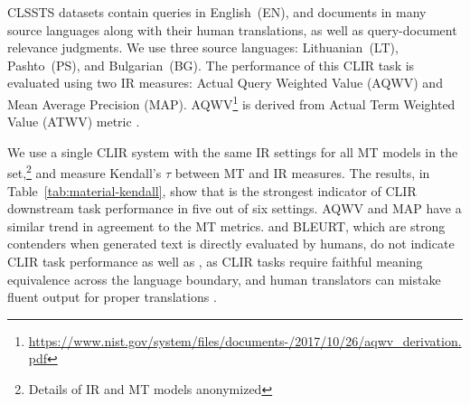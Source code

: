 CLSSTS datasets contain queries in English~(EN), and documents in many source languages along with their human translations, as well as query-document relevance judgments. 
We use three source languages: Lithuanian~(LT), Pashto~(PS), and Bulgarian~(BG).
The performance of this CLIR task is evaluated using two IR measures: Actual Query Weighted Value (AQWV) and Mean Average Precision (MAP).
AQWV\footnote{\href{https://www.nist.gov/system/files/documents/2017/10/26/aqwv\_derivation.pdf}{https://www.nist.gov/system/files/documents-/2017/10/26/aqwv\_derivation.pdf}} is derived from Actual Term Weighted Value (ATWV) metric \cite{wegmann2013ATWV}. 


We use a single CLIR system with the same IR settings for all MT models in the set,\footnote{Details of IR and MT models anonymized} and measure Kendall's $\tau$ between MT and IR measures.
The results, in Table~\ref{tab:material-kendall}, show that  is the strongest indicator of CLIR downstream task performance in five out of six settings.
AQWV and MAP have a similar trend in agreement to the MT metrics.
 and BLEURT, which are strong contenders when generated text is directly evaluated by humans, do not indicate CLIR task performance as well as , as CLIR tasks require faithful meaning equivalence across the language boundary, and human translators can mistake fluent output for proper translations \cite{callison-burch-etal-2007-meta}. 



